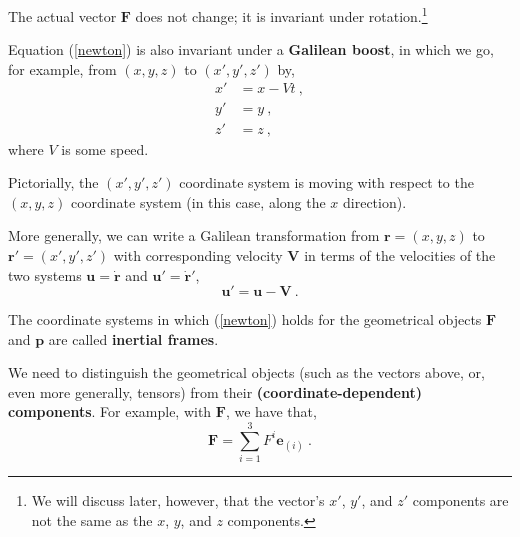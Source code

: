 \documentclass[11pt]{article}
\begin{document}
The actual vector $\textbf{F}$ does not change; it is invariant under rotation.\footnote{We will discuss later, however, that the vector's $x'$, $y'$, and $z'$ components are not the same as the $x$, $y$, and $z$ components.}

Equation (\ref{newton}) is also invariant under a \textbf{Galilean boost}, in which we go, for example, from $(x,y,z)$ to $(x',y',z')$ by,
\begin{align}
x' &= x-Vt\ ,\\
y' &= y\ ,\\
z' &= z\ ,
\end{align}
where $V$ is some speed.\pagebreak

Pictorially, the $(x',y',z')$ coordinate system is moving with respect to the $(x,y,z)$ coordinate system (in this case, along the $x$ direction).

\begin{figure}[H]    
\centering
{}
\caption{}
\end{figure}

More generally, we can write a Galilean transformation from $\textbf{r} = (x,y,z)$ to $\textbf{r}' = (x',y',z')$ with corresponding velocity $\textbf{V}$ in terms of the velocities of the two systems $\textbf{u} = \dot{\textbf{r}}$ and $\textbf{u}' = \dot{\textbf{r}}'$,
\begin{equation}
\textbf{u}' = \textbf{u} - \textbf{V}\ .
\end{equation}

The coordinate systems in which (\ref{newton}) holds for the geometrical objects $\textbf{F}$ and $\textbf{p}$ are called \textbf{inertial frames}.

We need to distinguish the geometrical objects (such as the vectors above, or, even more generally, tensors) from their \textbf{(coordinate-dependent) components}. For example, with $\textbf{F}$, we have that,
\begin{equation}
\textbf{F} = \sum_{i=1}^3 F^i \textbf{e}_{(i)}\ .
\end{equation}
\end{document}
